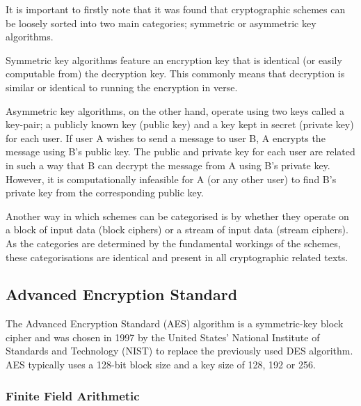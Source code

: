 \documentclass[a4paper,10pt]{report}
\begin{document}
It is important to firstly note that it was found that cryptographic schemes can be loosely sorted into two main categories; symmetric or asymmetric key algorithms. 

Symmetric key algorithms feature an encryption key that is identical (or easily computable from) the decryption key. This commonly means that decryption is similar or identical to running the encryption in verse.

Asymmetric key algorithms, on the other hand, operate using two keys called a key-pair; a publicly known key (public key) and a key kept in secret (private key) for each user. If user A wishes to send a message to user B, A encrypts the message using B's public key. The public and private key for each user are related in such a way that B can decrypt the message from A using B's private key. However, it is computationally infeasible for A (or any other user) to find B's private key from the corresponding public key.

Another way in which schemes can be categorised is by whether they operate on a block of input data (block ciphers) or a stream of input data (stream ciphers). As the categories are determined by the fundamental workings of the schemes, these categorisations are identical and present in all cryptographic related texts. 

\subsection{Advanced Encryption Standard}

The Advanced Encryption Standard (AES) algorithm is a symmetric-key block cipher and was chosen in 1997 by the United States' National Institute of Standards and Technology (NIST) to replace the previously used DES algorithm. AES typically uses a 128-bit block size and a key size of 128, 192 or 256. 

\subsubsection{Finite Field Arithmetic}
\end{document}
